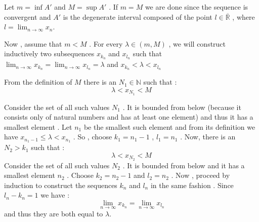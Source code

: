 \documentclass[12pt]{article}
\begin{document}
Let $m=\inf A'$ and $M=\sup A'$ . If $m=M$ we are done since the sequence is
convergent and $A'$ is the degenerate interval composed of the point $l \in
\mathbb{\overline{R}}$ , where $\displaystyle l=\lim_{n\rightarrow \infty} x_n$.

Now , assume that $m<M$ . For every $\lambda \in (m,M)$ , we will construct
inductively two subsequences $x_{k_n}$ and $x_{l_n}$ such that $\displaystyle
\lim_{n \rightarrow \infty} x_{k_n} = \lim_{n\rightarrow \infty} x_{l_n} = \lambda$
and $\displaystyle x_{k_n} < \lambda < x_{l_n}$

From the definition of $M$ there is an $N_1 \in \mathbb{N}$ such that :
$$ \lambda < x_{N_1} < M $$

Consider the set of all such values $N_1$ . It is bounded from below (because it
consists only of natural numbers and has at least one element) and thus it has a
smallest element . Let $n_1$ be the smallest such element and from its definition we
have $x_{n_1-1} \leq \lambda < x_{n_1}$ . So , choose $k_1=n_1 - 1$ , $l_1=n_1$ .
Now, there is an $N_2 > k_1$ such that :
$$ \lambda < x_{N_2} < M$$
Consider the set of all such values $N_2$ . It is bounded from below and it has a
smallest element $n_2$ . Choose $k_2 = n_2-1$ and $l_2=n_2$ . Now , proceed by
induction to construct the sequences $k_n$ and $l_n$ in the same fashion . Since
$l_n-k_n=1$ we have :
$$ \lim_{n\rightarrow \infty} x_{k_n} = \lim_{n\rightarrow \infty} x_{l_n}$$ and
thus they are both equal to $\lambda$.
\end{document}
